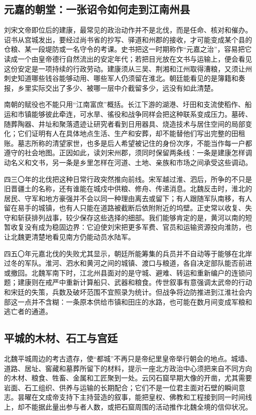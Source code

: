 \subsection{元嘉的朝堂：一张诏令如何走到江南州县}

刘宋文帝即位后的建康，最常见的政治动作并不是北伐，而是任命、核对和催办。诏书从宫城发出，要经过尚书省的抄写、驿道和州郡的接收，才可能变成某个县的仓粮、某一段堤防或一名守令的考课。史书把这一时期称作“元嘉之治”，容易把它读成一个由皇帝德行自然流出的安定年代；若把目光放在文书与运输上，便会看见这份安定是一项持续的行政劳动。建康须从三吴、荆湘和江州取得漕粮，又须让州刺史知道哪些钱谷能够动用、哪些军人仍须留在淮北。朝廷能看见的是簿籍和奏报，乡里实际交出了多少、被哪一层中介截留多少，远没有如此清楚。

南朝的赋役也不能只用“江南富庶”概括。长江下游的湖港、圩田和支流使稻作、船运和市镇能够彼此牵连，可水旱、徭役和战争同样会把这种联系变成压力。墓砖、随葬陶器、井址和聚落遗迹让研究者看到日用器具、烧造技术与居住空间的局部变化；它们证明有人在具体地点生活、生产和安葬，却不能替他们写出完整的田租账。墓志所称的清望家世，也多是后人希望被记住的身份次序，不能当作每一户都遵守的社会地图。正因如此，读刘宋州郡，须同时保留两条线：一条是建康怎样调动名义和文书，另一条是乡里怎样在河道、土地、亲族和市场之间承受这些调动。

四三〇年的北伐把这种日常行政突然推向前线。宋军越过淮、泗后，所争的不只是旧晋疆土的名称，还有谁能在城戍中供粮、修舟、传递消息。北魏反击时，淮北的居民、守军和地方豪强并不会以同一种理由离去或留下；有人跟随军队南移，有人留在易手的城镇，也有人只能在道路被截断后依附附近的坞壁。正史常以收复、失守和斩获排列战事，较少保存这些选择的细部。我们能够肯定的是，黄河以南的短暂收复没有成为稳固边界：它迫使刘宋把更多军费、官员和运输资源投向淮防，也让北魏更清楚地看见南方仍能动员水陆军。

四五〇年元嘉北伐的失败尤其显示，朝廷所能筹集的兵员并不自动等于能够在北岸过冬的军队。淮河、泗水和黄河之间的城镇、渡口与粮道，各自决定部队能否前进或撤回。北魏军南下时，江北州县面对的是守城、避难、转运和重新编户的连锁问题；建康则在戒严中重新计算船只、武器和粮食。传世叙事有意强调太武帝的行动和宋廷的失策，兵数及破坏范围不宜照录为统计。但战争将边防推进到江淮社会内部这一点并不含糊：一条原本供给市镇和田庄的水路，也可能在数月间变成军粮和逃亡者的通道。

\subsection{平城的木材、石工与宫廷}

北魏平城周边的考古遗存，使“都城”不再只是帝纪里皇帝举行朝会的地点。城墙、道路、居址、窖藏和墓葬所留下的材料，提示一座北方政治中心须把来自不同方向的木材、粮食、牲畜、金属和工匠聚到一处。云冈石窟早期大像的开凿，尤其需要岩面、石工组织、供养与运输的长期配合；它们不是一位君主面对石壁的瞬间意志。昙曜在文成帝支持下主持营造的叙事，能把皇权、佛教和工程接到同一时间线上，却不能据此量出参与者人数，或把石窟周围的活动推作北魏全境的信仰状况。

